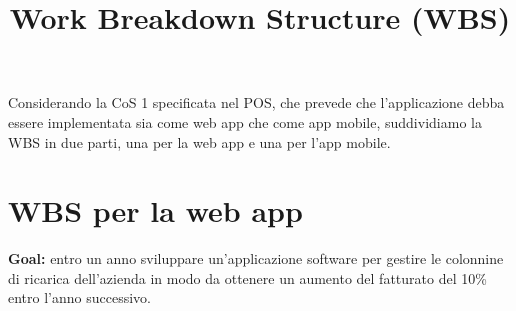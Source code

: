 \documentclass[a4paper,12pt]{article}
\title{\textbf{Work Breakdown Structure (WBS)}}
\author{}
\date{}
\begin{document}
\maketitle
\tableofcontents

\newpage

Considerando la CoS 1 specificata nel POS, che prevede che l'applicazione debba essere implementata sia come web app
che come app mobile, suddividiamo la WBS in due parti, una per la web app e una per l'app mobile.\\

\section{WBS per la web app}
\textbf{Goal:} entro un anno sviluppare un'applicazione software per gestire le colonnine di ricarica dell'azienda in
modo da ottenere un aumento del fatturato del 10\% entro l'anno successivo.
\end{document}
